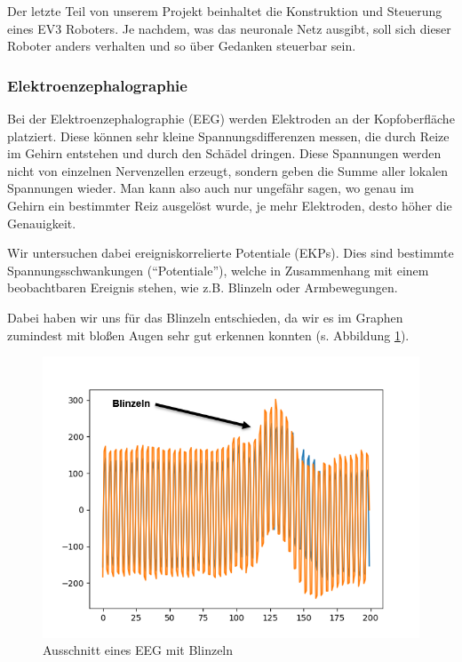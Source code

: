 \documentclass{scrartcl}
\begin{document}
	Der letzte Teil von unserem Projekt beinhaltet die Konstruktion und Steuerung eines EV3 Roboters. Je nachdem, was das neuronale Netz ausgibt, soll sich dieser Roboter anders verhalten und so über Gedanken steuerbar sein.	

	\subsubsection{Elektroenzephalographie}

	Bei der Elektroenzephalographie (EEG) werden Elektroden an der Kopfoberfläche platziert. Diese können sehr kleine Spannungsdifferenzen messen, die durch Reize im Gehirn entstehen und durch den Schädel dringen. Diese Spannungen werden nicht von einzelnen Nervenzellen erzeugt, sondern geben die Summe aller lokalen Spannungen wieder. Man kann also auch nur ungefähr sagen, wo genau im Gehirn ein bestimmter Reiz ausgelöst wurde, je mehr Elektroden, desto höher die Genauigkeit. \cite{wiki:EEG}

	Wir untersuchen dabei ereigniskorrelierte Potentiale (EKPs). Dies sind bestimmte Spannungsschwankungen (\enquote{Potentiale}), welche in Zusammenhang mit einem beobachtbaren Ereignis stehen, wie z.B. Blinzeln oder Armbewegungen. \cite{Birbaumer2010} \cite{Praktikum}

	Dabei haben wir uns für das Blinzeln entschieden, da wir es im Graphen zumindest mit bloßen Augen sehr gut erkennen konnten (s. Abbildung \ref{EEG-Blinzeln}).

	\begin{figure}[h]
		\includegraphics{pictures/blinzeln_ekp_beispiel_pyplot_annotated.png}
		\caption{Ausschnitt eines EEG mit Blinzeln}
		\label{EEG-Blinzeln}
	\end{figure}
\end{document}
